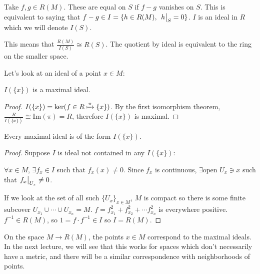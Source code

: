 \documentclass[a4paper,twoside,master.tex]{subfiles}
\begin{document}
Take $ f,g \in R(M) $. These are equal on $ S $ if $ f-g $ vanishes on $ S $. This is equivalent to saying that $ f-g \in I = \{h \in R(M),\ \eval{h}_{S} = 0\} $. $ I $ is an ideal in $ R $ which we will denote $ I(S) $.

This means that $ \frac{R(M)}{I(S)} \cong R(S) $. The quotient by ideal is equivalent to the ring on the smaller space.

Let's look at an ideal of a point $ x \in M $:
\begin{claim}
    $ I(\{x\}) $ is a maximal ideal.
\end{claim}
\begin{proof}
    $ I(\{x\}) = \text{ker}(f \in R \xmapsto{\pi} \{x\}) $. By the first isomorphism theorem, $ \frac{R}{I(\{x\})} \cong \text{Im}(\pi) = R $, therefore $ I(\{x\}) $ is maximal.
\end{proof}
\begin{claim}
    Every maximal ideal is of the form $ I(\{x\}) $.
\end{claim}
\begin{proof}
    Suppose $ I $ is ideal not contained in any $ I(\{x\}) $:

    $ \forall x \in M $, $ \exists f_x \in I $ such that $ f_x(x) \neq 0 $. Since $ f_x $ is continuous, $ \exists \text{open } U_x \ni x $ such that $ \eval{f_x}_{U_x} \neq 0 $.

    If we look at the set of all such $ \{U_x\}_{x \in M} $, $ M $ is compact so there is some finite subcover $ U_{x_1} \cup \cdots \cup U_{x_n} = M $. $ f = f_{x_1}^2 + f_{x_2}^2 + \cdots f_{x_n}^2 $ is everywhere positive. $ f^{-1} \in R(M) $, so $ 1 = f \cdot f^{-1} \in I $ so $ I = R(M) $.
\end{proof}

On the space $ M \to R(M) $, the points $ x \in M $ correspond to the maximal ideals. In the next lecture, we will see that this works for spaces which don't necessarily have a metric, and there will be a similar correspondence with neighborhoods of points.
\end{document}
